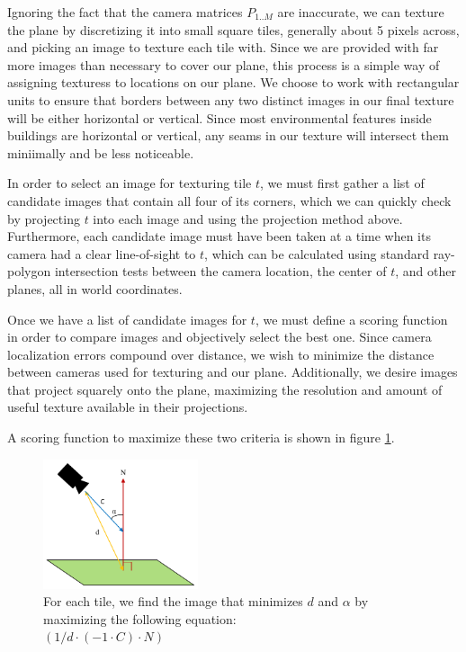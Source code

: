 \documentclass[10pt,twocolumn,letterpaper]{article}
\begin{document}
Ignoring the fact that the camera matrices $P_{1..M}$ are inaccurate,
we can texture the plane by discretizing it into small square tiles,
generally about 5 pixels across, and picking an image to texture each
tile with. Since we are provided with far more images than necessary
to cover our plane, this process is a simple way of assigning
texturess to locations on our plane. We choose to work with
rectangular units to ensure that borders between any two distinct
images in our final texture will be either horizontal or
vertical. Since most environmental features inside buildings are
horizontal or vertical, any seams in our texture will intersect them
miniimally and be less noticeable.

In order to select an image for texturing tile $t$, we must first
gather a list of candidate images that contain all four of its
corners, which we can quickly check by projecting $t$ into each image
and using the projection method above. Furthermore, each candidate
image must have been taken at a time when its camera had a clear
line-of-sight to $t$, which can be calculated using
standard ray-polygon intersection tests between the camera location,
the center of $t$, and other planes, all in world coordinates.

Once we have a list of candidate images for $t$, we must define a
scoring function in order to compare images and objectively select the
best one. Since camera localization errors compound over distance, we
wish to minimize the distance between cameras used for texturing and
our plane. Additionally, we desire images that project squarely onto
the plane, maximizing the resolution and amount of useful texture
available in their projections.

A scoring function to maximize these two criteria is shown in figure
\ref{fig:scoringFunction}.

\begin{figure}
  \centering
  \includegraphics[height=1.5in]{scoringFunction.pdf}
  \caption{For each tile, we find the image that minimizes $d$ and
    $\alpha$ by maximizing the following equation: \\ $(1/d \cdot (-1
    \cdot C) \cdot N)$}
  \label{fig:scoringFunction}
\end{figure}
\end{document}
